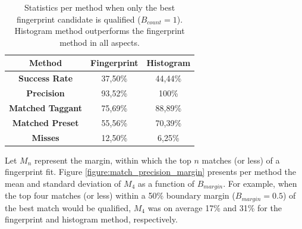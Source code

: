 \documentclass[thesis.tex]{subfiles}
\begin{document}
\begin{table}[h!]
  \caption{Statistics per method when only the best fingerprint candidate is qualified ($B_{count} = 1$). Histogram method outperforms the fingerprint method in all aspects.}
  \label{table:match_precision_count1}

  \begin{center}
  \begin{tabular}{| c | c | c |}
    \hline
    \textbf{Method} & Fingerprint & Histogram \\
    \hline
    \textbf{Success Rate} & 37,50\% & 44,44\% \\
    \hline
    \textbf{Precision} & 93,52\% & 100\% \\
    \hline
    \textbf{Matched Taggant} & 75,69\% & 88,89\% \\
    \hline
    \textbf{Matched Preset} & 55,56\% & 70,39\% \\
    \hline
    \textbf{Misses} & 12,50\% & 6,25\% \\
    \hline
  \end{tabular}
  \end{center}
\end{table}

Let $M_n$ represent the margin, within which the top $n$ matches (or less) of a fingerprint fit. Figure \ref{figure:match_precision_margin} presents per method the mean and standard deviation of $M_4$ as a function of $B_{margin}$. For example, when the top four matches (or less) within a 50\% boundary margin ($B_{margin}=0.5$) of the best match would be qualified, $M_4$ was on average 17\% and 31\% for the fingerprint and histogram method, respectively.

\clearpage
\end{document}
